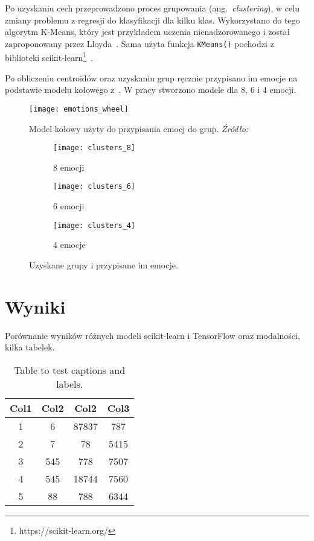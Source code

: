Po uzyskaniu cech przeprowadzono proces grupowania (ang.~\textit{clustering}), w celu zmiany problemu z regresji do klasyfikacji dla kilku klas.
Wykorzystano do tego algorytm K-Means, który jest przykładem uczenia nienadzorowanego i został zaproponowany przez Lloyda~\cite{Lloyd1982}.
Sama użyta funkcja \texttt{KMeans()} pochodzi z biblioteki scikit-learn\footnote{https://scikit-learn.org/}~\cite{scikit-learn}.

Po obliczeniu centroidów oraz uzyskaniu grup ręcznie przypisano im emocje na podstawie modelu kołowego z~\cite{Kollias2019}.
W pracy stworzono modele dla 8, 6 i 4 emocji.

\begin{figure}[h]
    \centering
    \texttt{[image: emotions\_wheel]}
    \caption{Model kołowy użyty do przypisania emocj do grup. \textit{Źródło:~\cite{Kollias2019}}}
    \label{fig:emotions-wheel}
\end{figure}

\begin{figure}[h!]
    \begin{subfigure}{0.5\textwidth}
        \centering
        \texttt{[image: clusters\_8]}
        \caption{8 emocji}
        \label{fig:clusters-8}
    \end{subfigure}
    \begin{subfigure}{0.5\textwidth}
        \centering
        \texttt{[image: clusters\_6]}
        \caption{6 emocji}
        \label{fig:clusters-6}
    \end{subfigure}
    \begin{subfigure}{0.5\textwidth}
        \centering
        \texttt{[image: clusters\_4]}
        \caption{4 emocje}
        \label{fig:clusters-4}
    \end{subfigure}
    \caption{Uzyskane grupy i przypisane im emocje.}
    \label{fig:clusters-all}
\end{figure}

\section{Wyniki}\label{sec:wyniki}
Porównanie wyników różnych modeli scikit-learn i TensorFlow oraz modalności, kilka tabelek.

\begin{table}[h!]
    \centering
    \begin{tabular}{||c c c c||}
        \hline
        Col1 & Col2 & Col2 & Col3 \\ [0.5ex]
        \hline\hline
        1 & 6 & 87837 & 787 \\
        2 & 7 & 78 & 5415 \\
        3 & 545 & 778 & 7507 \\
        4 & 545 & 18744 & 7560 \\
        5 & 88 & 788 & 6344 \\ [1ex]
        \hline
    \end{tabular}
    \caption{Table to test captions and labels.}
    \label{tab:table1}
\end{table}
